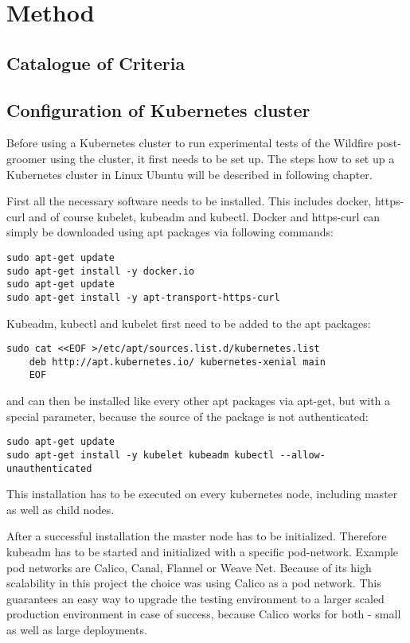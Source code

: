 
\chapter{Method}

\section{Catalogue of Criteria}

\section{Configuration of Kubernetes cluster}

Before using a Kubernetes cluster to run experimental tests of the Wildfire post-groomer using the cluster, it first needs to be set up. The steps how to set up a Kubernetes cluster in Linux Ubuntu will be described in following chapter.

First all the necessary software needs to be installed. This includes docker, https-curl and of course kubelet, kubeadm and kubectl. Docker and https-curl can simply be downloaded using apt packages via following commands:
\begin{lstlisting}[caption={Kubernetes requirements installation},captionpos=b]
sudo apt-get update
sudo apt-get install -y docker.io
sudo apt-get update
sudo apt-get install -y apt-transport-https-curl
\end{lstlisting}
Kubeadm, kubectl and kubelet first need to be added to the apt packages:
\begin{lstlisting}[caption={Add Kubernetes package to apt},captionpos=b]
sudo cat <<EOF >/etc/apt/sources.list.d/kubernetes.list
	deb http://apt.kubernetes.io/ kubernetes-xenial main
	EOF
\end{lstlisting}
and can then be installed like every other apt packages via apt-get, but with a special parameter, because the source of the package is not authenticated:
\begin{lstlisting}[caption={Install Kubernetes},captionpos=b]
sudo apt-get update
sudo apt-get install -y kubelet kubeadm kubectl --allow-unauthenticated
\end{lstlisting}
This installation has to be executed on every kubernetes node, including master as well as child nodes.

After a successful installation the master node has to be initialized. Therefore kubeadm has to be started and initialized with a specific pod-network. Example pod networks are Calico, Canal, Flannel or Weave Net. Because of its high scalability in this project the choice was using Calico as a pod network. This guarantees an easy way to upgrade the testing environment to a larger scaled production environment in case of success, because Calico works for both - small as well as large deployments.

